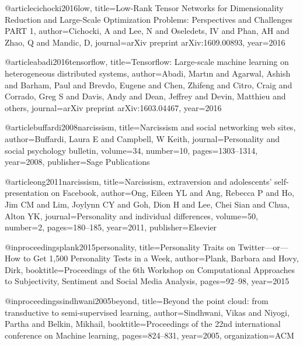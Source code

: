 @article{cichocki2016low,
  title={Low-Rank Tensor Networks for Dimensionality Reduction and Large-Scale Optimization Problems: Perspectives and Challenges PART 1},
  author={Cichocki, A and Lee, N and Oseledets, IV and Phan, AH and Zhao, Q and Mandic, D},
  journal={arXiv preprint arXiv:1609.00893},
  year={2016}
}

@article{abadi2016tensorflow,
  title={Tensorflow: Large-scale machine learning on heterogeneous distributed systems},
  author={Abadi, Mart{\i}n and Agarwal, Ashish and Barham, Paul and Brevdo, Eugene and Chen, Zhifeng and Citro, Craig and Corrado, Greg S and Davis, Andy and Dean, Jeffrey and Devin, Matthieu and others},
  journal={arXiv preprint arXiv:1603.04467},
  year={2016}
}



@article{buffardi2008narcissism,
  title={Narcissism and social networking web sites},
  author={Buffardi, Laura E and Campbell, W Keith},
  journal={Personality and social psychology bulletin},
  volume={34},
  number={10},
  pages={1303--1314},
  year={2008},
  publisher={Sage Publications}
}

@article{ong2011narcissism,
  title={Narcissism, extraversion and adolescents’ self-presentation on Facebook},
  author={Ong, Eileen YL and Ang, Rebecca P and Ho, Jim CM and Lim, Joylynn CY and Goh, Dion H and Lee, Chei Sian and Chua, Alton YK},
  journal={Personality and individual differences},
  volume={50},
  number={2},
  pages={180--185},
  year={2011},
  publisher={Elsevier}
}

@inproceedings{plank2015personality,
  title={Personality Traits on Twitter—or—How to Get 1,500 Personality Tests in a Week},
  author={Plank, Barbara and Hovy, Dirk},
  booktitle={Proceedings of the 6th Workshop on Computational Approaches to Subjectivity, Sentiment and Social Media Analysis},
  pages={92--98},
  year={2015}
}

@inproceedings{sindhwani2005beyond,
  title={Beyond the point cloud: from transductive to semi-supervised learning},
  author={Sindhwani, Vikas and Niyogi, Partha and Belkin, Mikhail},
  booktitle={Proceedings of the 22nd international conference on Machine learning},
  pages={824--831},
  year={2005},
  organization={ACM}
}




